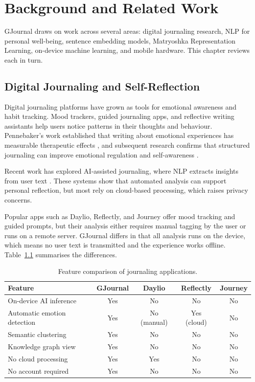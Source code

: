 \chapter{Background and Related Work}
\label{ch:background}

GJournal draws on work across several areas: digital journaling research, NLP for personal well-being, sentence embedding models, Matryoshka Representation Learning, on-device machine learning, and mobile hardware. This chapter reviews each in turn.

\section{Digital Journaling and Self-Reflection}

Digital journaling platforms have grown as tools for emotional awareness and habit tracking. Mood trackers, guided journaling apps, and reflective writing assistants help users notice patterns in their thoughts and behaviour. Pennebaker's work established that writing about emotional experiences has measurable therapeutic effects \cite{pennebaker1997writing}, and subsequent research confirms that structured journaling can improve emotional regulation and self-awareness \cite{Sivaram2022HealthyMe}.

Recent work has explored AI-assisted journaling, where NLP extracts insights from user text \cite{10351450}. These systems show that automated analysis can support personal reflection, but most rely on cloud-based processing, which raises privacy concerns.

Popular apps such as Daylio, Reflectly, and Journey offer mood tracking and guided prompts, but their analysis either requires manual tagging by the user or runs on a remote server. GJournal differs in that all analysis runs on the device, which means no user text is transmitted and the experience works offline. Table~\ref{tab:app_comparison} summarises the differences.

\begin{table}[h]
\centering
\caption{Feature comparison of journaling applications.}
\label{tab:app_comparison}
\begin{tabular}{|l|c|c|c|c|}
\hline
\textbf{Feature} & \textbf{GJournal} & \textbf{Daylio} & \textbf{Reflectly} & \textbf{Journey} \\
\hline
On-device AI inference      & Yes & No          & No          & No \\
Automatic emotion detection & Yes & No (manual) & Yes (cloud) & No \\
Semantic clustering         & Yes & No          & No          & No \\
Knowledge graph view        & Yes & No          & No          & No \\
No cloud processing         & Yes & Yes         & No          & No \\
No account required         & Yes & No          & No          & No \\
\hline
\end{tabular}
\end{table}

